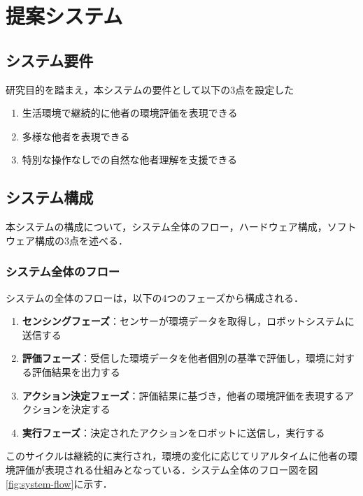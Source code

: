 \documentclass{cuxarticle}
\begin{document}
\chapter{提案システム}

\section{システム要件}
研究目的を踏まえ，本システムの要件として以下の3点を設定した

\begin{enumerate}
  \item 生活環境で継続的に他者の環境評価を表現できる
  \item 多様な他者を表現できる
  \item 特別な操作なしでの自然な他者理解を支援できる
\end{enumerate}

\section{システム構成}
本システムの構成について，システム全体のフロー，ハードウェア構成，ソフトウェア構成の3点を述べる．

\subsection{システム全体のフロー}
システムの全体のフローは，以下の4つのフェーズから構成される．

\begin{enumerate}
  \item \textbf{センシングフェーズ}：センサーが環境データを取得し，ロボットシステムに送信する
  \item \textbf{評価フェーズ}：受信した環境データを他者個別の基準で評価し，環境に対する評価結果を出力する
  \item \textbf{アクション決定フェーズ}：評価結果に基づき，他者の環境評価を表現するアクションを決定する
  \item \textbf{実行フェーズ}：決定されたアクションをロボットに送信し，実行する
\end{enumerate}

このサイクルは継続的に実行され，環境の変化に応じてリアルタイムに他者の環境評価が表現される仕組みとなっている．システム全体のフロー図を図\ref{fig:system-flow}に示す．
\end{document}
